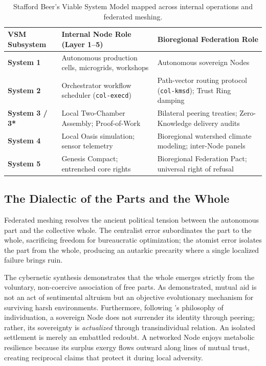 \begin{table}[htbp]
\centering
\small
\setlength{\tabcolsep}{4pt}
\begin{tabular}{|p{}|p{}|p{}|}
\hline
\textbf{VSM Subsystem} & \textbf{Internal Node Role (Layer 1--5)} & \textbf{Bioregional Federation Role} \\
\hline
\textbf{System 1} & Autonomous production cells, microgrids, workshops & Autonomous sovereign Nodes \\
\hline
\textbf{System 2} & Orchestrator workflow scheduler (\texttt{col-execd}) & Path-vector routing protocol (\texttt{col-kmsd}); Trust Ring damping \\
\hline
\textbf{System 3 / 3*} & Local Two-Chamber Assembly; Proof-of-Work & Bilateral peering treaties; Zero-Knowledge delivery audits \\
\hline
\textbf{System 4} & Local Oasis simulation; sensor telemetry & Bioregional watershed climate modeling; inter-Node panels \\
\hline
\textbf{System 5} & Genesis Compact; entrenched core rights & Bioregional Federation Pact; universal right of refusal \\
\hline
\end{tabular}
\caption{Stafford Beer's Viable System Model mapped across internal operations and federated meshing.}
\label{tab:l5-vsm-mapping}
\end{table}

\subsection{The Dialectic of the Parts and the Whole}

Federated meshing resolves the ancient political tension between the autonomous part and the collective whole. The centralist error subordinates the part to the whole, sacrificing freedom for bureaucratic optimization; the atomist error isolates the part from the whole, producing an autarkic precarity where a single localized failure brings ruin.

The cybernetic synthesis demonstrates that the whole emerges strictly from the voluntary, non-coercive association of free parts. As \textcite{kropotkin1902} demonstrated, mutual aid is not an act of sentimental altruism but an objective evolutionary mechanism for surviving harsh environments. Furthermore, following \textcite{simondon2020}'s philosophy of individuation, a sovereign Node does not surrender its identity through peering; rather, its sovereignty is \textit{actualized} through transindividual relation. An isolated settlement is merely an embattled redoubt. A networked Node enjoys metabolic resilience because its surplus exergy flows outward along lines of mutual trust, creating reciprocal claims that protect it during local adversity.

